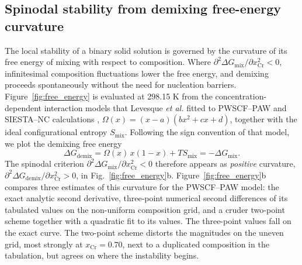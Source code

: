 \documentclass[final,3p,times]{elsarticle}
\begin{document}
\subsection{Spinodal stability from demixing free-energy curvature}

The local stability of a binary solid solution is governed by the curvature of its free energy of mixing with respect to composition. Where $\partial^2 \Delta G_{\mathrm{mix}}/\partial x_{\mathrm{Cr}}^2 < 0$, infinitesimal composition fluctuations lower the free energy, and demixing proceeds spontaneously without the need for nucleation barriers. Figure~\ref{fig:free_energy} is evaluated at 298.15 K from the concentration-dependent interaction models that Levesque \textit{et al.} fitted to PWSCF--PAW and SIESTA--NC calculations \cite{levesque2011simple}, $\Omega(x)=(x-a)(bx^2+cx+d)$, together with the ideal configurational entropy $S_{\mathrm{mix}}$. Following the sign convention of that model, we plot the demixing free energy
\begin{equation}
\Delta G_{\mathrm{demix}} = \Omega(x)\,x(1-x) + T S_{\mathrm{mix}} = -\Delta G_{\mathrm{mix}}.
\label{eqn:demix}
\end{equation}
The spinodal criterion $\partial^2 \Delta G_{\mathrm{mix}}/\partial x_{\mathrm{Cr}}^2 < 0$ therefore appears as \emph{positive} curvature, $\partial^2 \Delta G_{\mathrm{demix}}/\partial x_{\mathrm{Cr}}^2 > 0$, in Fig.~\ref{fig:free_energy}b. Figure~\ref{fig:free_energy}b compares three estimates of this curvature for the PWSCF--PAW model: the exact analytic second derivative, three-point numerical second differences of its tabulated values on the non-uniform composition grid, and a cruder two-point scheme together with a quadratic fit to its values. The three-point values fall on the exact curve. The two-point scheme distorts the magnitudes on the uneven grid, most strongly at $x_{\mathrm{Cr}}=0.70$, next to a duplicated composition in the tabulation, but agrees on where the instability begins.
\end{document}
